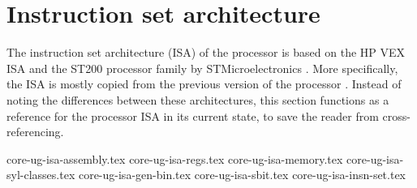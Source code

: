 
\clearpage
\section{Instruction set architecture}
\label{sec:core-ug-isa}

The instruction set architecture (ISA) of the \rvex{} processor is based on the 
HP VEX ISA  and the ST200 processor family 
by STMicroelectronics . 
More specifically, the ISA is mostly copied from the previous version of the 
\rvex processor . Instead of noting the differences between these architectures, 
this section functions as a reference for the \rvex{} processor ISA in its 
current state, to save the reader from cross-referencing.

{core-ug-isa-assembly.tex}
{core-ug-isa-regs.tex}
{core-ug-isa-memory.tex}
{core-ug-isa-syl-classes.tex}
{core-ug-isa-gen-bin.tex}
{core-ug-isa-sbit.tex}
{core-ug-isa-insn-set.tex}






